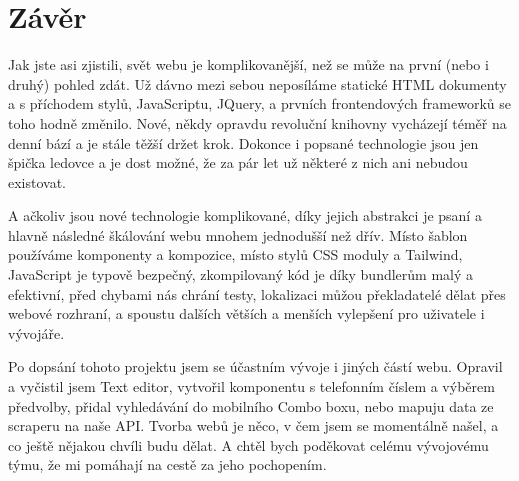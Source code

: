 \chapter*{Závěr}

Jak jste asi zjistili, svět webu je komplikovanější, než se může na první (nebo i druhý) pohled zdát. Už dávno mezi sebou neposíláme statické HTML dokumenty a s příchodem stylů, JavaScriptu, JQuery, a prvních frontendových frameworků se toho hodně změnilo. Nové, někdy opravdu revoluční knihovny vycházejí téměř na denní bází a je stále těžší držet krok. Dokonce i popsané technologie jsou jen špička ledovce a je dost možné, že za pár let už některé z nich ani nebudou existovat.

A ačkoliv jsou nové technologie komplikované, díky jejich abstrakci je psaní a hlavně následné škálování webu mnohem jednodušší než dřív. Místo šablon používáme komponenty a kompozice, místo stylů CSS moduly a Tailwind, JavaScript je typově bezpečný, zkompilovaný kód je díky bundlerům malý a efektivní, před chybami nás chrání testy, lokalizaci můžou překladatelé dělat přes webové rozhraní, a spoustu dalších větších a menších vylepšení pro uživatele i vývojáře.

Po dopsání tohoto projektu jsem se účastním vývoje i jiných částí webu. Opravil a vyčistil jsem Text editor, vytvořil komponentu s telefonním číslem a výběrem předvolby, přidal vyhledávání do mobilního Combo boxu, nebo mapuju data ze scraperu na naše API. Tvorba webů je něco, v čem jsem se momentálně našel, a co ještě nějakou chvíli budu dělat. A chtěl bych poděkovat celému vývojovému týmu, že mi pomáhají na cestě za jeho pochopením.